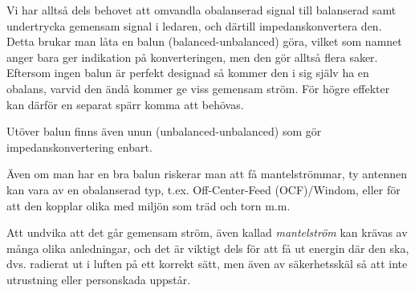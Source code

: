Vi har alltså dels behovet att omvandla obalanserad signal till balanserad
samt undertrycka gemensam signal i ledaren, och därtill impedanskonvertera den.
Detta brukar man låta en balun (balanced-unbalanced) göra, vilket som namnet
anger bara ger indikation på konverteringen, men den gör alltså flera saker.
Eftersom ingen balun är perfekt designad så kommer den i sig själv ha en
obalans, varvid den ändå kommer ge viss gemensam ström.
För högre effekter kan därför en separat spärr komma att behövas.

Utöver balun finns även unun (unbalanced-unbalanced) som gör
impedanskonvertering enbart.

Även om man har en bra balun riskerar man att få mantelströmmar, ty antennen
kan vara av en obalanserad typ, t.ex. Off-Center-Feed (OCF)/Windom, eller
för att den kopplar olika med miljön som träd och torn m.m.

Att undvika att det går gemensam ström, även kallad \emph{mantelström} kan
krävas av många olika anledningar, och det är viktigt dels för att få ut
energin där den ska, dvs. radierat ut i luften på ett korrekt sätt, men även
av säkerhetsskäl så att inte utrustning eller personskada uppstår.
